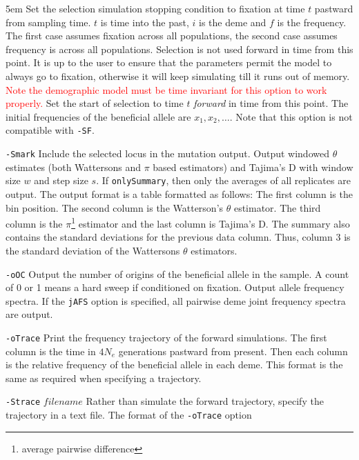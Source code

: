 \documentclass{article}
\begin{document}
\begin{eqlist*}{\topsep5em}
Set the selection simulation stopping condition to
fixation at time $t$ pastward from sampling time. $t$ is time into the past,
$i$ is the deme and $f$ is the frequency. The first case assumes fixation
across all populations, the second case assumes frequency is across all
populations. Selection is not used forward in time from this point. It is up to
the user to ensure that the parameters permit the model to always go to
fixation,  otherwise it will keep simulating till it runs out of memory. \\
\textcolor{red}{ Note the demographic model must be time invariant for this option to work properly.}
 Set the start of selection to
time $t$ {\em forward} in time from this point. The initial frequencies of the
beneficial allele are $x_1,x_2,\ldots$. Note that this option is not compatible with
{\tt -SF}.
\item[{\tt -Smark}] Include the selected locus in the mutation output. 
\longitem[{\tt -oTPi} $w$ $s$ {\tt [onlySummary]}] Output windowed 
$\theta$ estimates (both Wattersons and $\pi$ based estimators) and Tajima's D
with window size $w$ and step size $s$. If {\tt onlySummary}, then only the
averages of all replicates are output. The output format is a table formatted as follows:
The first column is the bin position. The second column is the Watterson's
$\theta$ estimator. The third column is the $\pi$\footnote{average pairwise
difference} estimator and the last column is Tajima's D. The summary also
contains the standard deviations for the previous data column. Thus, column 3 is
the standard deviation of the Wattersons $\theta$ estimators. 
\item[{\tt -oOC}] Output the number of origins of the beneficial allele in the
sample. A count of 0 or 1 means a hard sweep if conditioned on fixation. 
\longitem[{-tt -oAFS} {\tt [jAFS]} {\tt [onlySummary]} ] Output allele  
frequency spectra. If the {\tt jAFS} option is specified, all pairwise deme
joint frequency spectra are output.
\item[{\tt -oTrace}] Print the frequency trajectory of the forward
simulations. The first column is the time in $4N_e$ generations pastward from
present. Then each column is the relative frequency of the beneficial allele in
each deme. This format is the same as required when specifying a trajectory. 
\item[{\tt -Strace} $filename$] Rather than simulate the forward trajectory,
specify the trajectory in a text file. The format of the {\tt -oTrace} option

\end{eqlist*}
\end{document}
